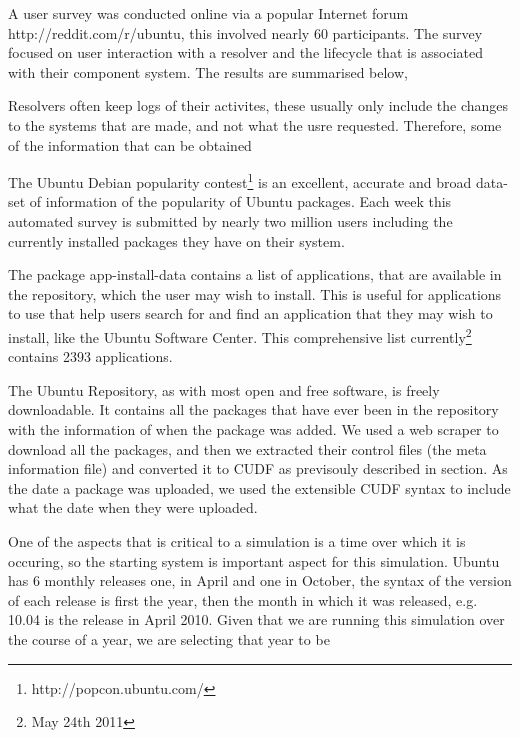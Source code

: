 A user survey was conducted online via a popular Internet forum http://reddit.com/r/ubuntu, this involved nearly 60 participants. %
The survey focused on user interaction with a resolver and the lifecycle that is associated with their component system.
The results are summarised below, %

Resolvers often keep logs of their activites, these usually only include the changes to the systems that are made, and not what the usre requested.
Therefore, some of the information that can be obtained

The Ubuntu Debian popularity contest\footnote{http://popcon.ubuntu.com/} is an excellent, accurate and broad data-set of information of the popularity of Ubuntu packages.
Each week this automated survey is submitted by nearly two million users including the currently installed packages they have on their system.



The package app-install-data contains a list of applications, that are available in the repository, which the user may wish to install.
This is useful for applications to use that help users search for and find an application that they may wish to install, like the Ubuntu Software Center.
This comprehensive list currently\footnote{May 24th 2011} contains 2393 applications.

The Ubuntu Repository, as with most open and free software, is freely downloadable.
It contains all the packages that have ever been in the repository with the information of when the package was added.
We used a web scraper to download all the packages, and then we extracted their control files (the meta information file) and converted it to CUDF as previsouly described in section. %
As the date a package was uploaded, we used the extensible CUDF syntax to include what the date when they were uploaded.

One of the aspects that is critical to a simulation is a time over which it is occuring, 
so the starting system is important aspect for this simulation.
Ubuntu has 6 monthly releases one, in April and one in October, the syntax of the version of each release is first the year,
then the month in which it was released, e.g. 10.04 is the release in April 2010.
Given that we are running this simulation over the course of a year, we are selecting that year to be 


